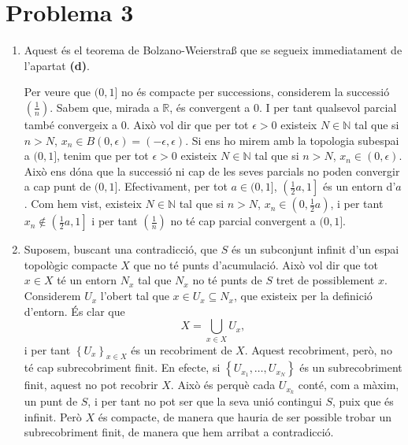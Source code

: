 \documentclass[12pt]{article}
\numberwithin{table}{section}
\numberwithin{figure}{section}
\numberwithin{equation}{section}
\newcommand{\N}{\mathbb{N}}
\newcommand{\R}{\mathbb{R}}
\newcommand{\set}[1]{\left\{ #1\right\}}
\begin{document}
\section*{Problema 3}
\begin{enumerate}[label=(\alph*), font=\bfseries \sffamily, wide, labelwidth=!, labelindent=0pt]
	\item Aquest és el teorema de Bolzano-Weierstraß que se segueix immediatament de l'apartat \textbf{\textsf{(d)}}. 

		Per veure que \( (0,1] \) no és compacte per successions, considerem la successió \( \left(\tfrac{1}{n}\right) \). Sabem que, mirada a \( \R \), és convergent a 0. I per tant qualsevol parcial també convergeix a \( 0 \). Això vol dir que per tot \( \epsilon > 0 \) existeix \( N \in \N \) tal que si \( n > N \), \( x_n \in B(0, \epsilon) = (-\epsilon, \epsilon) \). Si ens ho mirem amb la topologia subespai a \( (0,1] \), tenim que per tot \( \epsilon > 0 \) existeix \( N \in \N \) tal que si \( n > N \), \( x_n \in (0, \epsilon) \). Això ens dóna que la successió ni cap de les seves parcials no poden convergir a cap punt de \( (0,1] \). Efectivament, per tot \( a \in (0,1] \), \( \left(\tfrac{1}{2}a, 1\right] \) és un entorn d'\( a \). Com hem vist, existeix \( N \in \N \) tal que si \( n > N \), \( x_n \in \left(0,\tfrac{1}{2}a\right) \), i per tant \( x_n \notin \left(\tfrac{1}{2}a, 1\right] \) i per tant \( \left(\tfrac{1}{n}\right) \) no té cap parcial convergent a \( (0,1] \).

	\item Suposem, buscant una contradicció, que \( S \) és un subconjunt infinit d'un espai topològic compacte \( X \) que no té punts d'acumulació. Això vol dir que tot \( x \in X \) té un entorn \( N_x \) tal que \( N_x \) no té punts de \( S \) tret de possiblement \( x \). Considerem \( U_x \) l'obert tal que \( x \in U_x \subseteq N_x \), que existeix per la definició d'entorn. És clar que 
		\begin{equation*}
			X = \bigcup_{x \in X} U_x,
		\end{equation*}
		i per tant \( \set{U_x}_{x \in X} \) és un recobriment de \( X \). Aquest recobriment, però, no té cap subrecobriment finit. En efecte, si \( \set{U_{x_1}, \dots, U_{x_N}} \) és un subrecobriment finit, aquest no pot recobrir \( X \). Això és perquè cada \( U_{x_k} \) conté, com a màxim, un punt de \( S \), i per tant no pot ser que la seva unió contingui \( S \), puix que és infinit. Però \( X \) és compacte, de manera que hauria de ser possible trobar un subrecobriment finit, de manera que hem arribat a contradicció.  


\end{enumerate}
\end{document}
